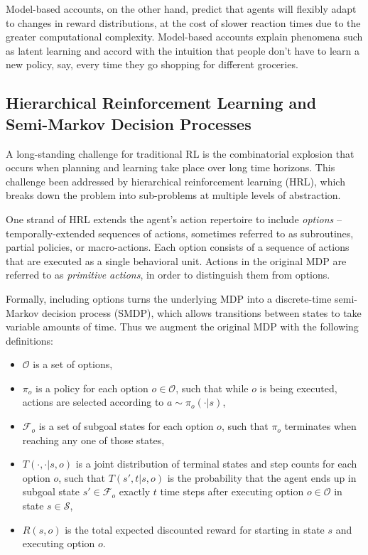 \documentclass[11pt]{article}
\begin{document}
Model-based accounts, on the other hand, predict that agents will flexibly adapt to changes in reward distributions, at the cost of slower reaction times due to the greater computational complexity. Model-based accounts explain phenomena such as latent learning and accord with the intuition that people don't have to learn a new policy, say, every time they go shopping for different groceries.

\subsection{Hierarchical Reinforcement Learning and Semi-Markov Decision Processes}

A long-standing challenge for traditional RL is the combinatorial explosion that occurs when planning and learning take place over long time horizons. This challenge been addressed by hierarchical reinforcement learning (HRL), which breaks down the problem into sub-problems at multiple levels of abstraction.

One strand of HRL extends the agent's action repertoire to include \textit{options} \cite{Sutton1999} -- temporally-extended sequences of actions, sometimes referred to as subroutines, partial policies, or macro-actions. Each option consists of a sequence of actions that are executed as a single behavioral unit. Actions in the original MDP are referred to as \textit{primitive actions}, in order to distinguish them from options.

Formally, including options turns the underlying MDP into a discrete-time semi-Markov decision process (SMDP), which allows transitions between states to take variable amounts of time. Thus we augment the original MDP with the following definitions:

\begin{itemize}
\item $\mathcal{O}$ is a set of options,
\item $\pi_o$ is a policy for each option $o \in \mathcal{O}$, such that while $o$ is being executed, actions are selected according to $a \sim \pi_o(\cdot|s)$,
\item $\mathcal{F}_o$ is a set of subgoal states for each option $o$, such that $\pi_o$ terminates when reaching any one of those states,
\item $T(\cdot,\cdot|s,o)$ is a joint distribution of terminal states and step counts for each option $o$, such that $T(s',t|s,o)$ is the probability that the agent ends up in subgoal state $s' \in \mathcal{F}_o$ exactly $t$ time steps after executing option $o \in \mathcal{O}$ in state $s \in \mathcal{S}$,
\item $R(s,o)$ is the total expected discounted reward for starting in state $s$ and executing option $o$.
\end{itemize}
\end{document}
